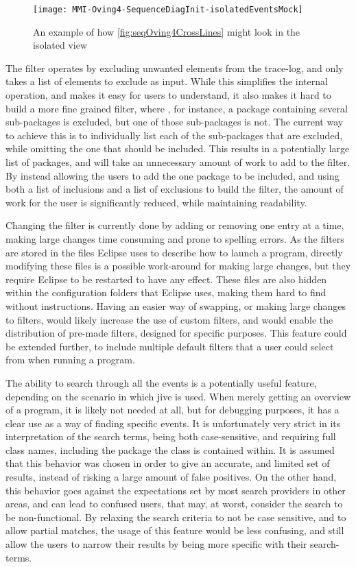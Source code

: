 \begin{figure}[H]
	\centering
	\texttt{[image: MMI-Oving4-SequenceDiagInit-isolatedEventsMock]}
	\caption{An example of how \autoref{fig:seqOving4CrossLines} might look in the isolated view}
	\label{fig:seqOving4IsolatedMock}
\end{figure}


The filter operates by excluding unwanted elements from the trace-log, and only takes a list of elements to exclude as input.
While this simplifies the internal operation, and makes it easy for users to understand, it also makes it hard to build a more fine grained filter, where , for instance, a package containing several sub-packages is excluded, but one of those sub-packages is not.
The current way to achieve this is to individually list each of the sub-packages that are excluded, while omitting the one that should be included.
This results in a potentially large list of packages, and will take an unnecessary amount of work to add to the filter.
By instead allowing the users to add the one package to be included, and using both a list of inclusions and a list of exclusions to build the filter, the amount of work for the user is significantly reduced, while maintaining readability.


Changing the filter is currently done by adding or removing one entry at a time, making large changes time consuming and prone to spelling errors.
As the filters are stored in the files Eclipse uses to describe how to launch a program, directly modifying these files is a possible work-around for making large changes, but they require Eclipse to be restarted to have any effect.
These files are also hidden within the configuration folders that Eclipse uses, making them hard to find without instructions.
Having an easier way of swapping, or making large changes to filters, would likely increase the use of custom filters, and would enable the distribution of pre-made filters, designed for specific purposes.
This feature could be extended further, to include multiple default filters that a user could select from when running a program.


The ability to search through all the events is a potentially useful feature, depending on the scenario in which \gls{jive} is used.
When merely getting an overview of a program, it is likely not needed at all, but for debugging purposes, it has a clear use as a way of finding specific events.
It is unfortunately very strict in its interpretation of the search terms, being both case-sensitive, and requiring full class names, including the package the class is contained within.
It is assumed that this behavior was chosen in order to give an accurate, and limited set of results, instead of risking a large amount of false positives.
On the other hand, this behavior goes against the expectations set by most search providers in other areas, and can lead to confused users, that may, at worst, consider the search to be non-functional.
By relaxing the search criteria to not be case sensitive, and to allow partial matches, the usage of this feature would be less confusing, and still allow the users to narrow their results by being more specific with their search-terms.


